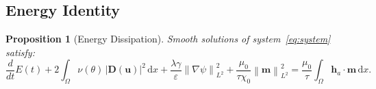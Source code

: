 \documentclass[11pt,a4paper]{article}
\newtheorem{proposition}{Proposition}[section]
\theoremstyle{definition}
\theoremstyle{remark}
\newcommand{\dd}{\,\mathrm{d}}
\newcommand{\grad}{\nabla}
\newcommand{\eps}{\varepsilon}
\newcommand{\norm}[1]{\left\| #1 \right\|}
\newcommand{\bfu}{\bm{u}}
\newcommand{\bfm}{\bm{m}}
\newcommand{\bfh}{\bm{h}}
\begin{document}
\subsection{Energy Identity}

\begin{proposition}[Energy Dissipation]
  \label{prop:energy}
  Smooth solutions of system~\eqref{eq:system} satisfy:
  \begin{equation}
    \label{eq:energy-law}
    \frac{d}{dt} E(t)
    + 2\int_\Omega \nu(\theta)\,|\bm{D}(\bfu)|^2 \dd x
    + \frac{\lambda\gamma}{\eps}\norm{\grad\psi}^2_{L^2}
    + \frac{\mu_0}{\tau\chi_0}\norm{\bfm}^2_{L^2}
    = \frac{\mu_0}{\tau}\int_\Omega \bfh_a \cdot \bfm \dd x.
  \end{equation}
\end{proposition}
\end{document}
